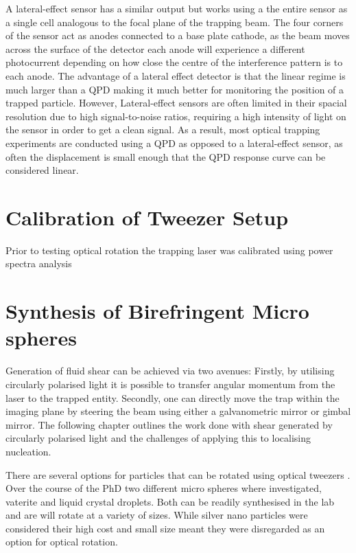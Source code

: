 A lateral-effect sensor has a similar output but works using a 
the entire sensor as a single cell analogous to the focal plane of
the trapping beam. The four corners of the sensor act as anodes 
connected to a base plate cathode, as the beam moves across the
surface of the detector each anode will experience a different 
photocurrent depending on how close the centre of the 
interference pattern is to each anode. The advantage of a 
lateral effect detector is that the linear regime is much larger 
than a QPD making it much better for monitoring the position of a
trapped particle. However, Lateral-effect sensors are often limited
in their spacial resolution due to high signal-to-noise ratios, 
requiring a high intensity of light on the sensor in order to 
get a clean signal. As a result, most optical trapping experiments
are conducted using a QPD as opposed to a lateral-effect sensor, 
as often the displacement is small enough that the QPD response 
curve can be considered linear.

\section{Calibration of Tweezer Setup}
Prior to testing optical rotation the trapping laser was calibrated 
using power spectra analysis


\section{Synthesis of Birefringent Micro spheres}
\label{sec:vaterite}
Generation of fluid shear can be achieved via two avenues: Firstly, by 
utilising circularly polarised light it is possible to transfer angular 
momentum from the laser to the trapped entity. Secondly, one can 
directly move the trap within the imaging plane by steering the beam 
using either a galvanometric mirror or gimbal mirror. The following 
chapter outlines the work done with shear generated by circularly 
polarised light and the challenges of applying this to localising 
nucleation. 

There are several options for particles that can be rotated using 
optical tweezers \cite{Parkin2009, Saito2022}. Over the course of 
the PhD two different micro 
spheres where investigated, vaterite and liquid crystal droplets. Both 
can be readily synthesised in the lab and are will rotate at a variety 
of sizes. While silver nano particles were considered their high cost 
and small size meant they were disregarded as an option for optical 
rotation. 

